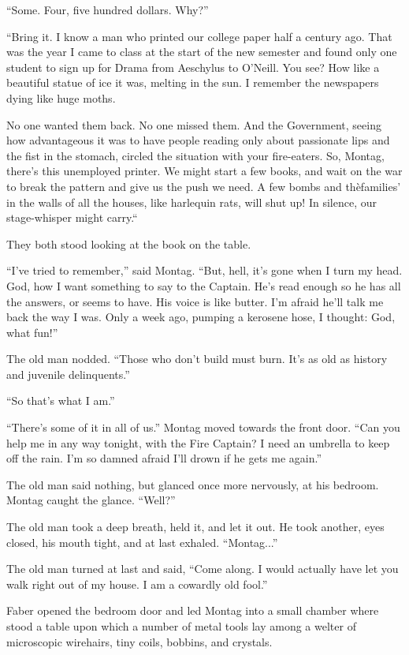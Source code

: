 \documentclass[11pt,openany]{book}
\begin{document}
``Some. Four, five hundred dollars. Why?''

``Bring it. I know a man who printed our college paper half a century ago. That was the year I came to class at the start of the new semester and found only one student to sign up for Drama from Aeschylus to O'Neill. You see? How like a beautiful statue of ice it was, melting in the sun. I remember the newspapers dying like huge moths.

No one wanted them back. No one missed them. And the Government, seeing how advantageous it was to have people reading only about passionate lips and the fist in the stomach, circled the situation with your fire-eaters. So, Montag, there's this unemployed printer. We might start a few books, and wait on the war to break the pattern and give us the push we need. A few bombs and thèfamilies' in the walls of all the houses, like harlequin rats, will shut up! In silence, our stage-whisper might carry.``

They both stood looking at the book on the table.

``I've tried to remember,'' said Montag. ``But, hell, it's gone when I turn my head. God, how I want something to say to the Captain. He's read enough so he has all the answers, or seems to have. His voice is like butter. I'm afraid he'll talk me back the way I was. Only a week ago, pumping a kerosene hose, I thought: God, what fun!''

The old man nodded. ``Those who don't build must burn. It's as old as history and juvenile delinquents.''

``So that's what I am.''

``There's some of it in all of us.'' Montag moved towards the front door. ``Can you help me in any way tonight, with the Fire Captain? I need an umbrella to keep off the rain. I'm so damned afraid I'll drown if he gets me again.''

The old man said nothing, but glanced once more nervously, at his bedroom. Montag caught the glance. ``Well?''

The old man took a deep breath, held it, and let it out. He took another, eyes closed, his mouth tight, and at last exhaled. ``Montag...''

The old man turned at last and said, ``Come along. I would actually have let you walk right out of my house. I am a cowardly old fool.''

Faber opened the bedroom door and led Montag into a small chamber where stood a table upon which a number of metal tools lay among a welter of microscopic wirehairs, tiny coils, bobbins, and crystals.
\end{document}
